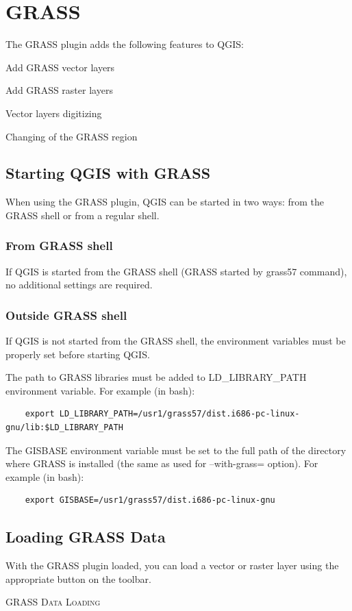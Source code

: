 \chapter{GRASS}\label{sec:grass}
The GRASS plugin adds the following features to QGIS:
\begin{compactitem}
\item Add GRASS vector layers
\item Add GRASS raster layers
\item Vector layers digitizing
\item Changing of the GRASS region
\end{compactitem}
\section{Starting QGIS with
GRASS}\label{sec:starting_grass}
When using the GRASS plugin, QGIS can be started in two ways: from the GRASS shell or from a regular shell.
\subsection{From GRASS shell}

If QGIS is started from the GRASS shell (GRASS started by grass57 command), no
additional settings are required. 
\subsection{Outside GRASS shell}

If QGIS is not started from the GRASS shell, the environment variables must be properly set before starting QGIS.
 
The path to GRASS libraries must be added to LD\_LIBRARY\_PATH environment
variable. For example (in bash): 
\begin{verbatim}
    export LD_LIBRARY_PATH=/usr1/grass57/dist.i686-pc-linux-gnu/lib:$LD_LIBRARY_PATH
\end{verbatim}    
 
The GISBASE environment variable must be set to the full path of the directory where GRASS is installed (the same as used for --with-grass= option). For example (in bash):
\begin{verbatim}
    export GISBASE=/usr1/grass57/dist.i686-pc-linux-gnu 
\end{verbatim}
\section{Loading GRASS Data}
With the GRASS plugin loaded, you can load a vector or raster layer using the appropriate button on the toolbar. \begin{Tip}\caption{\textsc{GRASS Data Loading}}
\end{Tip} 
